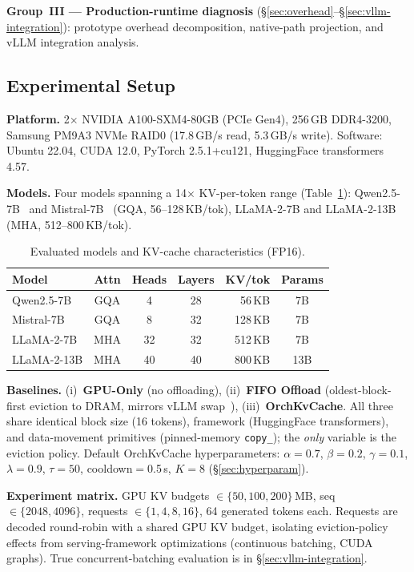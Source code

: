 \documentclass[conference]{IEEEtran}
\begin{document}
\noindent\textbf{Group~III --- Production-runtime diagnosis} (\S\ref{sec:overhead}--\S\ref{sec:vllm-integration}): prototype overhead decomposition, native-path projection, and vLLM integration analysis.

\subsection{Experimental Setup}

\textbf{Platform.} 2$\times$ NVIDIA A100-SXM4-80GB (PCIe Gen4), 256\,GB DDR4-3200, Samsung PM9A3 NVMe RAID0 (17.8\,GB/s read, 5.3\,GB/s write). Software: Ubuntu 22.04, CUDA 12.0, PyTorch 2.5.1+cu121, HuggingFace transformers 4.57.

\textbf{Models.} Four models spanning a 14$\times$ KV-per-token range (Table~\ref{tab:models}): Qwen2.5-7B~\cite{qwen2.5} and Mistral-7B~\cite{mistral} (GQA, 56--128\,KB/tok), LLaMA-2-7B and LLaMA-2-13B~\cite{llama2} (MHA, 512--800\,KB/tok).

\begin{table}[t]
\centering
\caption{Evaluated models and KV-cache characteristics (FP16).}
\label{tab:models}
\footnotesize
\setlength{\tabcolsep}{7pt}
\begin{tabular}{@{}lcccrc@{}}
\toprule
Model & Attn & Heads & Layers & KV/tok & Params \\
\midrule
Qwen2.5-7B   & GQA  & 4  & 28 & 56\,KB  & 7B  \\
Mistral-7B   & GQA  & 8  & 32 & 128\,KB & 7B  \\
LLaMA-2-7B   & MHA  & 32 & 32 & 512\,KB & 7B  \\
LLaMA-2-13B  & MHA  & 40 & 40 & 800\,KB & 13B \\
\bottomrule
\end{tabular}
\end{table}

\textbf{Baselines.} (i)~\textbf{GPU-Only} (no offloading), (ii)~\textbf{FIFO Offload} (oldest-block-first eviction to DRAM, mirrors vLLM swap~\cite{vllm}), (iii)~\textbf{OrchKvCache}. All three share identical block size (16 tokens), framework (HuggingFace transformers), and data-movement primitives (pinned-memory \texttt{copy\_}); the \emph{only} variable is the eviction policy. Default OrchKvCache hyperparameters: $\alpha{=}0.7$, $\beta{=}0.2$, $\gamma{=}0.1$, $\lambda{=}0.9$, $\tau{=}50$, cooldown$=$0.5\,s, $K{=}8$ (\S\ref{sec:hyperparam}).

\textbf{Experiment matrix.} GPU KV budgets $\in\{50, 100, 200\}$\,MB, seq $\in\{2048, 4096\}$, requests $\in\{1, 4, 8, 16\}$, 64 generated tokens each. Requests are decoded round-robin with a shared GPU KV budget, isolating eviction-policy effects from serving-framework optimizations (continuous batching, CUDA graphs). True concurrent-batching evaluation is in \S\ref{sec:vllm-integration}.
\end{document}
